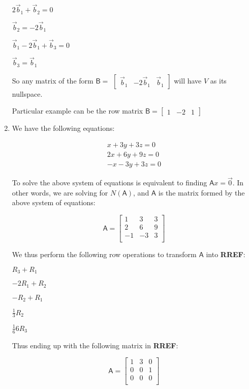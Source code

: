 \documentclass[a4paper, 11pt]{article}
\newcommand{\mat}[1]{\boldsymbol { \mathsf{#1}} }
\begin{document}
\begin{enumerate}
$2\vec b_1 + \vec b_2 = 0$

$\vec b_2 = -2\vec b_1$

$\vec b_1 - 2 \vec b_1 + \vec b_3 = 0$

$\vec b_3 = \vec b_1$

So any matrix of the form 
$\mat B = $
$
\begin{bmatrix}
	\vec b_1 & -2\vec b_1 & \vec b_1
\end{bmatrix}
$
will have $V$ as its nullspace.

Particular example can be the row matrix $\mat B = \begin{bmatrix} 1 & -2 & 1 \end{bmatrix}$
\item We have the following equations:

\begin{equation} \label{eq1}
\begin{split}
x + 3y + 3z  = 0\\
2x + 6y + 9z = 0\\
-x - 3y +3z  = 0
\end{split}
\end{equation}

To solve the above system of equations is equivalent to finding $\mat{A}x = \vec{0}$. In other words, we are solving for $N(\mat{A})$, and $\mat{A}$ is the matrix formed by the above system of equations:

\begin{equation*}
    \mat{A} =
    \begin{bmatrix}
    1 & 3 & 3 \\
    2 & 6 & 9 \\
    -1 & -3 & 3 \\
    \end{bmatrix}
\end{equation*}

We thus perform the following row operations to transform $\mat{A}$ into \textbf{RREF}: 

\begin{center}
$R_3 + R_1$

$-2R_1 + R_2$

$-R_2 + R_1$

$\frac{1}{3}R_2$

$\frac{1}{6}6R_3$

\end{center}

Thus ending up with the following matrix in \textbf{RREF}:

\begin{equation*}
    \mat{A} =
    \begin{bmatrix}
    1 & 3 & 0 \\
    0 & 0 & 1 \\
    0 & 0 & 0 \\
    \end{bmatrix}
\end{equation*}


\end{enumerate}
\end{document}
